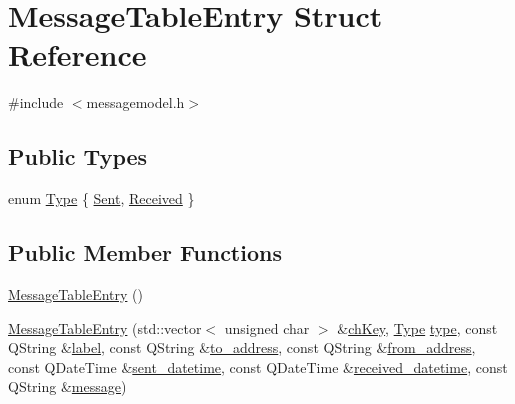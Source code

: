 \hypertarget{struct_message_table_entry}{}\section{Message\+Table\+Entry Struct Reference}
\label{struct_message_table_entry}


{\ttfamily \#include $<$messagemodel.\+h$>$}

\subsection*{Public Types}
\begin{DoxyCompactItemize}
\item 
enum \hyperlink{struct_message_table_entry_ab7cc6a426fb32f07e97e5b1d86d928e1}{Type} \{ \hyperlink{struct_message_table_entry_ab7cc6a426fb32f07e97e5b1d86d928e1a81be349f0b3c327841f3a87e40fa96c5}{Sent}, 
\hyperlink{struct_message_table_entry_ab7cc6a426fb32f07e97e5b1d86d928e1a0f98c8fa9cc0778b872bbbe641288b28}{Received}
 \}
\end{DoxyCompactItemize}
\subsection*{Public Member Functions}
\begin{DoxyCompactItemize}
\item 
\hyperlink{struct_message_table_entry_a765e2904003fd041495e678714f0b303}{Message\+Table\+Entry} ()
\item 
\hyperlink{struct_message_table_entry_aa447f2e671d3b00dae5d228be7721c77}{Message\+Table\+Entry} (std\+::vector$<$ unsigned char $>$ \&\hyperlink{struct_message_table_entry_a4cd0d26048e5131b597aa5c29656b341}{ch\+Key}, \hyperlink{struct_message_table_entry_ab7cc6a426fb32f07e97e5b1d86d928e1}{Type} \hyperlink{struct_message_table_entry_a7106560f01940e8ca3c205993984c352}{type}, const Q\+String \&\hyperlink{struct_message_table_entry_a5415b80eea55bcfa9691b77721ded722}{label}, const Q\+String \&\hyperlink{struct_message_table_entry_a1c0fe7cf6e729031f5624264e9c4d907}{to\+\_\+address}, const Q\+String \&\hyperlink{struct_message_table_entry_a0a79ec4e1251c9c2948f02e5dd615089}{from\+\_\+address}, const Q\+Date\+Time \&\hyperlink{struct_message_table_entry_ac780cbf7059b3a578a728eeb556f262d}{sent\+\_\+datetime}, const Q\+Date\+Time \&\hyperlink{struct_message_table_entry_a6143e8829e5cc13b77456893161e03aa}{received\+\_\+datetime}, const Q\+String \&\hyperlink{struct_message_table_entry_a2b795631375fbc3f2e70b78834b2cf49}{message})
\end{DoxyCompactItemize}
